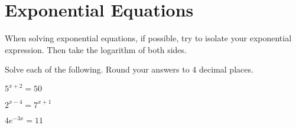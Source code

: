 \chapter{Exponential Equations}

When solving exponential equations, if possible, try to isolate your exponential expression. Then take the logarithm of both sides. \newline

\begin{example}
Solve each of the following. Round your answers to 4 decimal places. 
\begin{enumerate}[(a)]
\begin{multicols}{3}
\item $5^{x+2} = 50$
\item $2^{x-4} = 7^{x+1}$
\item $4e^{-3x} = 11$
\end{multicols}
\end{enumerate}
\end{example}

